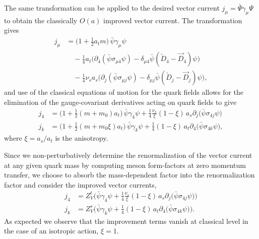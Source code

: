 \documentclass[twocolumn,amsmath,amssymb,prd,10pt,floatfix, 
superscriptaddress,nofootinbib, showpacs, preprintnumbers]{revtex4-1}
\begin{document}
The same transformation can be applied to the desired vector current $j_\mu = \bar{\Psi} \gamma_\mu \Psi$ to obtain the classically $O(a)$ improved vector current. The transformation gives
\begin{align*}
	j_\mu &= \big(1 + \tfrac{1}{2} a_t m \big)\, \bar{\psi} \gamma_\mu \psi    \\
	&\quad- \tfrac{1}{4} a_t \big( \partial_4 (\bar{\psi} \sigma_{\mu 4} \psi)  - \delta_{\mu 4} \bar{\psi} ( \overleftarrow{D}_{\!4} - \overrightarrow{D}_{\!4})\psi \big) \\
	&\quad- \tfrac{1}{4} \nu_s a_s \big( \partial_j (\bar{\psi} \sigma_{\mu j} \psi)  - \delta_{\mu j} \bar{\psi} ( \overleftarrow{D}_{\!j} - \overrightarrow{D}_{\!j})\psi \big),
\end{align*} 
and use of the classical equations of motion for the quark fields allows for the elimination of the gauge-covariant derivatives acting on quark fields to give
\begin{align*}
j_4 &= \big( 1 + \tfrac{1}{2}(m+m_0)a_t \big)\,  \bar{\psi}\gamma_4 \psi + \tfrac{1}{4} \tfrac{\nu_s}{\xi} ( 1- \xi) \, a_s \partial_j \big( \bar{\psi}\sigma_{4j} \psi\big)  \\
j_k &= \big( 1 + \tfrac{1}{2}(m+m_0 \xi)a_t \big)\,  \bar{\psi}\gamma_k \psi + \tfrac{1}{4} ( 1 - \xi) \, a_t \partial_4 \big( \bar{\psi}\sigma_{4k} \psi\big),
\end{align*}
where $\xi = a_s/a_t$ is the anisotropy.

Since we non-perturbatively determine the renormalization of the vector current at any given quark mass by computing meson form-factors at zero momentum transfer, we choose to absorb the mass-dependent factor into the renormalization factor and consider the improved vector currents,
\begin{align}
j_4 &= Z_V^t \Big(   \bar{\psi}\gamma_4 \psi + \tfrac{1}{4} \tfrac{\nu_s}{\xi} ( 1- \xi) \, a_s \partial_j \big( \bar{\psi}\sigma_{4j} \psi\big)  \Big) \nonumber \\
j_k &= Z_V^s \Big(   \bar{\psi}\gamma_k \psi + \tfrac{1}{4} ( 1 - \xi) \, a_t \partial_4 \big( \bar{\psi}\sigma_{4k} \psi\big) \Big).
\end{align}
As expected we observe that the improvement terms vanish at classical level in the case of an isotropic action, $\xi = 1$.
 




\end{document}
